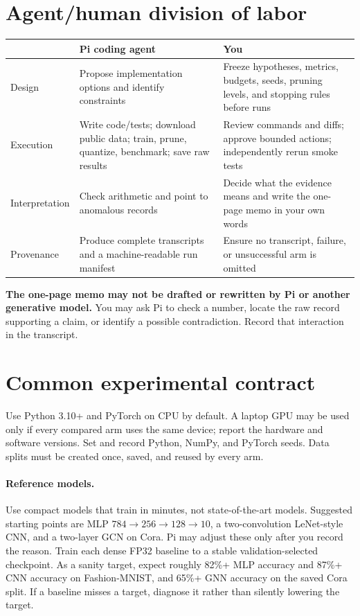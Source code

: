 \documentclass[11pt,letterpaper]{article}
\begin{document}
\section*{Agent/human division of labor}
\begin{tabularx}{\textwidth}{@{}p{}XX@{}}\toprule
 & Pi coding agent & You \\\midrule
Design & Propose implementation options and identify constraints & Freeze hypotheses, metrics, budgets, seeds, pruning levels, and stopping rules before runs \\
Execution & Write code/tests; download public data; train, prune, quantize, benchmark; save raw results & Review commands and diffs; approve bounded actions; independently rerun smoke tests \\
Interpretation & Check arithmetic and point to anomalous records & Decide what the evidence means and write the one-page memo in your own words \\
Provenance & Produce complete transcripts and a machine-readable run manifest & Ensure no transcript, failure, or unsuccessful arm is omitted \\
\bottomrule\end{tabularx}

\textbf{The one-page memo may not be drafted or rewritten by Pi or another generative model.} You may ask Pi to check a number, locate the raw record supporting a claim, or identify a possible contradiction. Record that interaction in the transcript.

\section*{Common experimental contract}
Use Python 3.10+ and PyTorch on CPU by default. A laptop GPU may be used only if every compared arm uses the same device; report the hardware and software versions. Set and record Python, NumPy, and PyTorch seeds. Data splits must be created once, saved, and reused by every arm.

\paragraph{Reference models.}
Use compact models that train in minutes, not state-of-the-art models. Suggested starting points are MLP $784\!\to\!256\!\to\!128\!\to\!10$, a two-convolution LeNet-style CNN, and a two-layer GCN on Cora. Pi may adjust these only after you record the reason. Train each dense FP32 baseline to a stable validation-selected checkpoint. As a sanity target, expect roughly 82\%+ MLP accuracy and 87\%+ CNN accuracy on Fashion-MNIST, and 65\%+ GNN accuracy on the saved Cora split. If a baseline misses a target, diagnose it rather than silently lowering the target.
\end{document}
